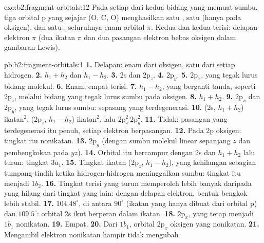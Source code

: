 \begin{solution}{exo:b2:fragment-orbitals:12}
Pada setiap dari kedua bidang yang memuat sumbu, tiga orbital p yang
sejajar (O, C, O) menghasilkan satu , satu 
(hanya pada oksigen), dan satu : seluruhnya enam orbital
$\pi$. Kedua  dan kedua  terisi: delapan
elektron $\pi$ (dua ikatan $\pi$ dan dua pasangan elektron bebas oksigen
dalam gambaran Lewis).
\end{solution}

\begin{solution}{pb:b2:fragment-orbitals:1}
\textbf{1.} Delapan: enam dari oksigen, satu dari setiap hidrogen.
\textbf{2.} $h_1 + h_2$ dan $h_1 - h_2$.
\textbf{3.} 2s dan $2\mathrm p_z$.
\textbf{4.} $2\mathrm p_y$.
\textbf{5.} $2\mathrm p_x$, yang tegak lurus bidang molekul.
\textbf{6.} Enam; empat terisi.
\textbf{7.} $h_1 - h_2$, yang berganti tanda, seperti $2\mathrm p_z$, melalui
bidang yang tegak lurus sumbu pada oksigen.
\textbf{8.} $h_1 + h_2$.
\textbf{9.} $2\mathrm p_x$ dan $2\mathrm p_y$, yang tegak lurus sumbu: sepasang
 yang terdegenerasi.
\textbf{10.} (2s, $h_1 + h_2$) ikatan$^2$, ($2\mathrm p_z$, $h_1 - h_2$) ikatan$^2$,
lalu $2\mathrm p_x^2\,2\mathrm p_y^2$.
\textbf{11.} Tidak: pasangan yang terdegenerasi itu penuh, setiap elektron
berpasangan.
\textbf{12.} Pada  2p oksigen: tingkat itu nonikatan.
\textbf{13.} $2\mathrm p_y$ (dengan sumbu molekul linear sepanjang $z$ dan
pembengkokan pada $yz$).
\textbf{14.} Orbital itu bercampur dengan 2s dan $h_1 + h_2$ lalu turun:
tingkat $3a_1$.
\textbf{15.} Tingkat ikatan ($2\mathrm p_z$, $h_1 - h_2$), yang kehilangan
sebagian tumpang-tindih ketika hidrogen-hidrogen meninggalkan sumbu:
tingkat itu menjadi $1b_2$.
\textbf{16.} Tingkat terisi yang turun memperoleh lebih banyak daripada yang
hilang dari tingkat yang lain: dengan delapan elektron, bentuk bengkok
lebih stabil.
\textbf{17.} $104.48^\circ$, di antara $90^\circ$ (ikatan yang hanya dibuat dari
orbital p) dan $109.5^\circ$: orbital 2s ikut berperan dalam ikatan.
\textbf{18.} $2\mathrm p_x$, yang tetap menjadi $1b_1$ nonikatan.
\textbf{19.} Empat.
\textbf{20.} Dari $1b_1$, orbital $2\mathrm p_x$ oksigen yang nonikatan.
\textbf{21.} Mengambil elektron nonikatan hampir tidak mengubah

\end{solution}
